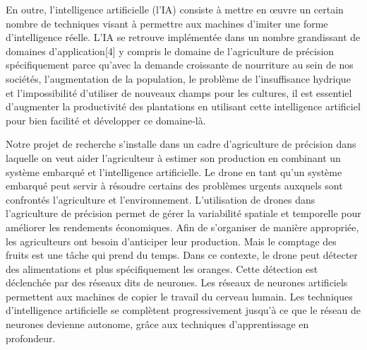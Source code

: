 En outre, l’intelligence artificielle (l’IA) consiste à mettre en œuvre un certain nombre de techniques visant à permettre aux machines d'imiter une forme d'intelligence réelle. L'IA se retrouve implémentée dans un nombre grandissant de domaines d'application[4] y compris le domaine de l’agriculture de précision spécifiquement parce qu’avec la demande croissante de nourriture au sein de nos sociétés, l’augmentation de la population, le problème de l’insuffisance hydrique et l’impossibilité d’utiliser de nouveaux champs pour les cultures, il est essentiel d’augmenter la productivité des plantations en utilisant cette intelligence artificiel pour bien facilité et développer ce domaine-là.


Notre projet de recherche s’installe dans un cadre d’agriculture de précision dans laquelle on veut aider l’agriculteur à estimer son production en combinant un système embarqué et l’intelligence artificielle. Le drone en tant qu’un système embarqué peut servir à résoudre certains des problèmes urgents auxquels sont confrontés l'agriculture et l'environnement. L'utilisation de drones dans l'agriculture de précision permet de gérer la variabilité spatiale et temporelle pour améliorer les rendements économiques. Afin de s’organiser de manière appropriée, les agriculteurs ont besoin d’anticiper leur production. Mais le comptage des fruits est une tâche qui prend du temps.
Dans ce contexte, le drone peut détecter des alimentations et plus spécifiquement les oranges. Cette détection est déclenchée par des réseaux dits de neurones. Les réseaux de neurones artificiels permettent aux machines de copier le travail du cerveau humain. Les techniques d'intelligence artificielle se complètent progressivement jusqu'à ce que le réseau de neurones devienne autonome, grâce aux techniques d'apprentissage en profondeur.

	
	
	
	
	
	
	
	
